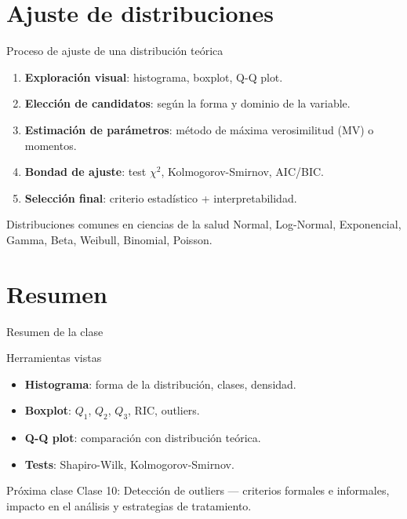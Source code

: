 \documentclass[aspectratio=169]{beamer}
\begin{document}
\section{Ajuste de distribuciones}

\begin{frame}{Proceso de ajuste de una distribución teórica}
  \begin{enumerate}
    \item \textbf{Exploración visual}: histograma, boxplot, Q-Q plot.
    \item \textbf{Elección de candidatos}: según la forma y dominio de la variable.
    \item \textbf{Estimación de parámetros}: método de máxima verosimilitud (MV) o momentos.
    \item \textbf{Bondad de ajuste}: test $\chi^2$, Kolmogorov-Smirnov, AIC/BIC.
    \item \textbf{Selección final}: criterio estadístico + interpretabilidad.
  \end{enumerate}
  \bigskip
  \begin{block}{Distribuciones comunes en ciencias de la salud}
    Normal, Log-Normal, Exponencial, Gamma, Beta, Weibull, Binomial, Poisson.
  \end{block}
\end{frame}

\section{Resumen}

\begin{frame}{Resumen de la clase}
  \begin{block}{Herramientas vistas}
    \begin{itemize}
      \item \textbf{Histograma}: forma de la distribución, clases, densidad.
      \item \textbf{Boxplot}: $Q_1$, $Q_2$, $Q_3$, RIC, outliers.
      \item \textbf{Q-Q plot}: comparación con distribución teórica.
      \item \textbf{Tests}: Shapiro-Wilk, Kolmogorov-Smirnov.
    \end{itemize}
  \end{block}
  \bigskip
  \begin{block}{Próxima clase}
    Clase 10: Detección de outliers — criterios formales e informales, impacto en el análisis y estrategias de tratamiento.
  \end{block}
\end{frame}
\end{document}
